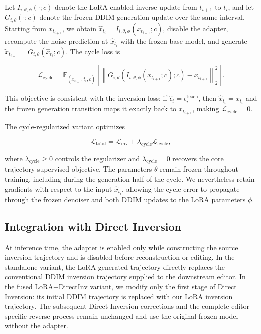 \documentclass{article} %
\begin{document}
Let $I_{i,\theta,\phi}(\cdot;c)$ denote the LoRA-enabled inverse update from $t_{i+1}$ to $t_i$, and let $G_{i,\theta}(\cdot;c)$ denote the frozen DDIM generation update over the same interval. Starting from $x_{t_{i+1}}$, we obtain $\hat{x}_{t_i}=I_{i,\theta,\phi}(x_{t_{i+1}};c)$, disable the adapter, recompute the noise prediction at $\hat{x}_{t_i}$ with the frozen base model, and generate $\tilde{x}_{t_{i+1}}=G_{i,\theta}(\hat{x}_{t_i};c)$. The cycle loss is

\[ \mathcal{L}_{\mathrm{cycle}}=\mathbb{E}_{(x_{t_{i+1}},t_i,c)}\left[\left\|G_{i,\theta}\!\left(I_{i,\theta,\phi}(x_{t_{i+1}};c);c\right)-x_{t_{i+1}}\right\|_2^2\right]. \]

This objective is consistent with the inversion loss: if $\hat{\epsilon}_i=\epsilon_i^{\mathrm{teach}}$, then $\hat{x}_{t_i}=x_{t_i}$ and the frozen generation transition maps it exactly back to $x_{t_{i+1}}$, making $\mathcal{L}_{\mathrm{cycle}}=0$.

The cycle-regularized variant optimizes

\[ \mathcal{L}_{\mathrm{total}}=\mathcal{L}_{\mathrm{inv}}+\lambda_{\mathrm{cycle}}\mathcal{L}_{\mathrm{cycle}}, \]

where $\lambda_{\mathrm{cycle}}\geq0$ controls the regularizer and $\lambda_{\mathrm{cycle}}=0$ recovers the core trajectory-supervised objective. The parameters $\theta$ remain frozen throughout training, including during the generation half of the cycle. We nevertheless retain gradients with respect to the input $\hat{x}_{t_i}$, allowing the cycle error to propagate through the frozen denoiser and both DDIM updates to the LoRA parameters $\phi$.

\subsection{Integration with Direct Inversion}
At inference time, the adapter is enabled only while constructing the source inversion trajectory and is disabled before reconstruction or editing. In the standalone variant, the LoRA-generated trajectory directly replaces the conventional DDIM inversion trajectory supplied to the downstream editor. In the fused LoRA+DirectInv variant, we modify only the first stage of Direct Inversion: its initial DDIM trajectory is replaced with our LoRA inversion trajectory. The subsequent Direct Inversion corrections and the complete editor-specific reverse process remain unchanged and use the original frozen model without the adapter.
\end{document}
